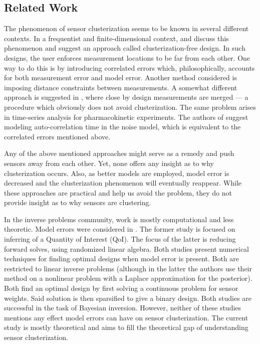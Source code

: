 \documentclass{amsart}
\numberwithin{equation}{section}
\begin{document}
\subsection{Related Work}
The phenomenon of sensor clusterization seems to be known in several
different contexts. In a frequentist and finite-dimensional context,
\cite{Fedorov96} and \cite[chapter 2.4.3]{Ucinski05} discuss this
phenomenon and suggest an approach called clusterization-free design.
In such designs, the user enforces measurement locations to be far
from each other. One way to do this is by introducing correlated
errors which, philosophically, accounts for both measurement error and
model error. Another method considered is imposing distance
constraints between measurements. A somewhat different approach is
suggested in \cite[page 49]{Fedorov12}, where close by design
measurements are merged --- a procedure which obviously does not avoid
clusterization. The same problem arises in time-series analysis for
pharmacokinetic experiments. The authors of \cite{Hooker09} suggest
modeling auto-correlation time in the noise model, which is equivalent
to the correlated errors mentioned above.

Any of the above mentioned approaches might serve as a remedy and push
sensors away from each other. Yet, none offers any insight as to why
clusterization occurs. Also, as better models are employed, model
error is decreased and the clusterization phenomenon will eventually
reappear. While these approaches are practical and help us avoid the
problem, they do not provide insight as to why sensors are clustering.

In the inverse problems community, work is mostly computational and
less theoretic. Model errors were considered in \cite{Attia20,
  Koval20}. The former study is focused on inferring of a Quantity of
Interest (QoI). The focus of the latter is reducing forward solves,
using randomized linear algebra. Both studies present numerical
techniques for finding optimal designs when model error is
present. Both are restricted to linear inverse problems (although in
the latter the authors use their method on a nonlinear problem with a
Laplace approximation for the posterior). Both find an optimal design
by first solving a continuous problem for sensor weights. Said
solution is then sparsified to give a binary design. Both studies are
successful in the task of Bayesian inversion. However, neither of
these studies mentions any effect model errors can have on sensor
clusterization. The current study is mostly theoretical and aims to
fill the theoretical gap of understanding sensor clusterization.
\end{document}
